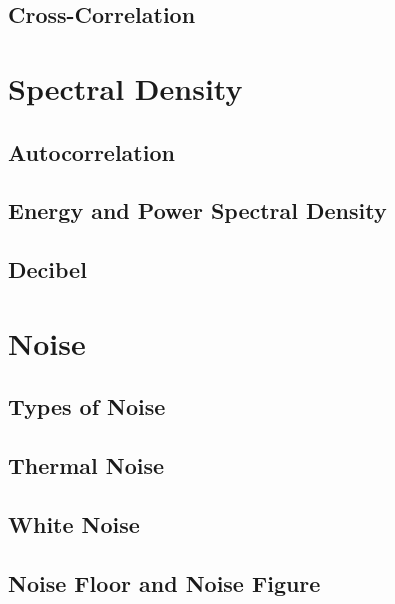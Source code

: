 \begin{refsection}
\subsection{Cross-Correlation}

\section{Spectral Density}

\subsection{Autocorrelation}

\subsection{Energy and Power Spectral Density}

\subsection{Decibel}

\section{Noise}

\subsection{Types of Noise}

\subsection{Thermal Noise}

\subsection{White Noise}

\subsection{Noise Floor and Noise Figure}

{}
\printbibliography[heading=subbibliography]
\end{refsection}

